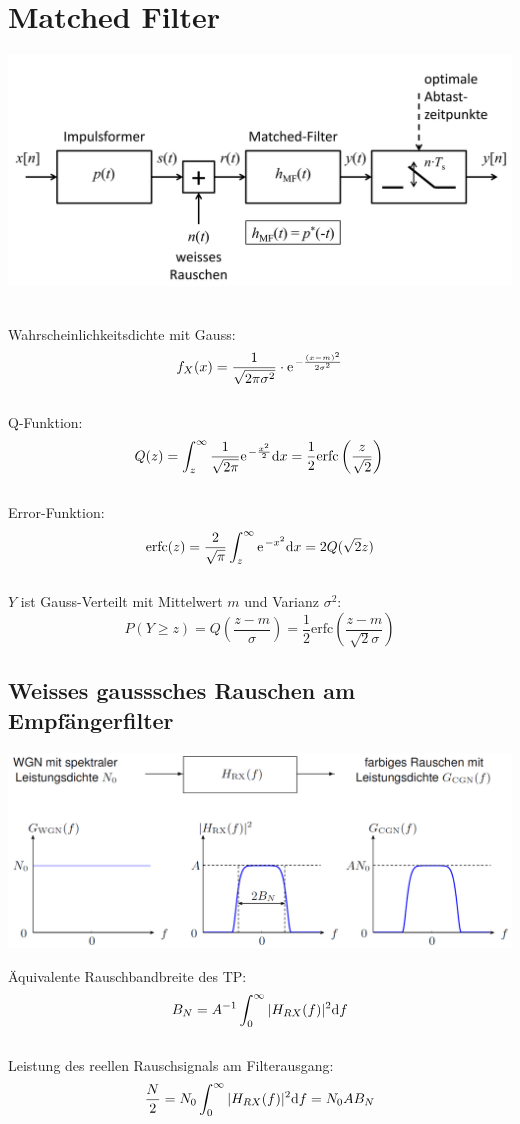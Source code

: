 \chapter{Matched Filter}
\begin{center}
	\includegraphics[width=.9\textwidth]{./images/matched}
\end{center}
~\\
Wahrscheinlichkeitsdichte mit Gauss:
\[
	f_X(x) = \frac{1}{\sqrt{2\pi\sigma^2}}\cdot\e^{-\frac{(x-m)^2}{2\sigma^2}}
\]
~\\
Q-Funktion:
\[
	Q(z) = \int_{z}^{\infty} \frac{1}{\sqrt{2\pi}}\e^{-\frac{x^2}{2}}\di x =
		\frac{1}{2}\textrm{erfc} \left( \frac{z}{\sqrt{2}} \right)
\]
~\\
Error-Funktion:
\[
	\textrm{erfc}(z) = \frac{2}{\sqrt{\pi}} \int_{z}^{\infty}\e^{-x^2}\di x = 2Q(\sqrt{2}z)
\]
~\\
$Y$ ist Gauss-Verteilt mit Mittelwert $m$ und Varianz $\sigma^2$:
\[
	P(Y\geq z) = Q\left(\frac{z-m}{\sigma}\right)
		= \frac{1}{2}\textrm{erfc}\left(\frac{z-m}{\sqrt{2}\sigma}\right)
\]

\section{Weisses gausssches Rauschen am Empfängerfilter}
\begin{center}
	\includegraphics[width=.9\textwidth]{./images/wgn.png}
\end{center}
Äquivalente Rauschbandbreite des TP:
\[
	B_N = A^{-1} \int_{0}^{\infty}|H_{RX}(f)|^2 \mathrm{d} f
\]
~\\
Leistung des reellen Rauschsignals am Filterausgang:
\[
	\frac{N}{2} = N_0 \int_{0}^{\infty}|H_{RX}(f)|^2 \mathrm{d} f = N_0AB_N
\]

